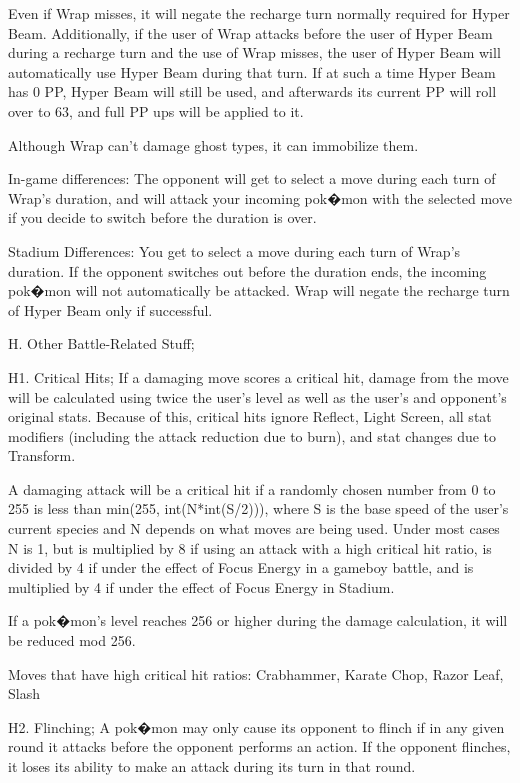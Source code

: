 \documentclass[reprint, aps, prl, paper=A4]{revtex4-1}
\begin{document}
Even if Wrap misses, it will negate the recharge turn normally required for Hyper Beam.
Additionally, if the user of Wrap attacks before the user of Hyper Beam during a recharge turn
and the use of Wrap misses, the user of Hyper Beam will automatically use Hyper Beam during
that turn. If at such a time Hyper Beam has 0 PP, Hyper Beam will still be used, and afterwards
its current PP will roll over to 63, and full PP ups will be applied to it.

Although Wrap can't damage ghost types, it can immobilize them.

In-game differences:
The opponent will get to select a move during each turn of Wrap's duration, and will attack
your incoming pok�mon with the selected move if you decide to switch before the duration is
over.

Stadium Differences:
You get to select a move during each turn of Wrap's duration. If the opponent switches out
before the duration ends, the incoming pok�mon will not automatically be attacked. Wrap will
negate the recharge turn of Hyper Beam only if successful.



H. Other Battle-Related Stuff;

H1. Critical Hits;
If a damaging move scores a critical hit, damage from the move will be calculated using twice
the user's level as well as the user's and opponent's original stats. Because of this, critical
hits ignore Reflect, Light Screen, all stat modifiers (including the attack reduction due to
burn), and stat changes due to Transform.

A damaging attack will be a critical hit if a randomly chosen number from 0 to 255 is less than
min(255, int(N*int(S/2))), where S is the base speed of the user's current species and N
depends on what moves are being used. Under most cases N is 1, but is multiplied by 8 if using
an attack with a high critical hit ratio, is divided by 4 if under the effect of Focus Energy
in a gameboy battle, and is multiplied by 4 if under the effect of Focus Energy in Stadium.

If a pok�mon's level reaches 256 or higher during the damage calculation, it will be reduced
mod 256.

Moves that have high critical hit ratios: Crabhammer, Karate Chop, Razor Leaf, Slash


H2. Flinching;
A pok�mon may only cause its opponent to flinch if in any given round it attacks before the
opponent performs an action. If the opponent flinches, it loses its ability to make an attack
during its turn in that round.
\end{document}
